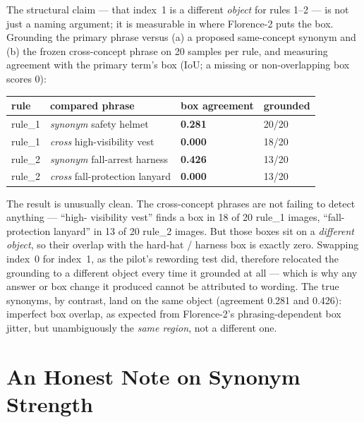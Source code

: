 The structural claim --- that index~1 is a different \emph{object} for rules 1--2 --- is not just a
naming argument; it is measurable in where Florence-2 puts the box. Grounding the primary phrase versus
(a) a proposed same-concept synonym and (b) the frozen cross-concept phrase on 20 samples per rule, and
measuring agreement with the primary term's box (IoU; a missing or non-overlapping box scores 0):

\begin{center}
\begin{tabular}{p{2.0cm}p{4.6cm}p{3.0cm}p{2.8cm}}
\toprule
\textbf{rule} & \textbf{compared phrase} & \textbf{box agreement} & \textbf{grounded} \\
\midrule
rule\_1 & \emph{synonym} safety helmet          & \textbf{0.281} & 20/20 \\
rule\_1 & \emph{cross} high-visibility vest      & \textbf{0.000} & 18/20 \\
\midrule
rule\_2 & \emph{synonym} fall-arrest harness     & \textbf{0.426} & 13/20 \\
rule\_2 & \emph{cross} fall-protection lanyard   & \textbf{0.000} & 13/20 \\
\bottomrule
\end{tabular}
\label{tab:p15-iou}
\end{center}

The result is unusually clean. The cross-concept phrases are not failing to detect anything --- ``high-
visibility vest'' finds a box in 18 of 20 rule\_1 images, ``fall-protection lanyard'' in 13 of 20
rule\_2 images. But those boxes sit on a \emph{different object}, so their overlap with the hard-hat /
harness box is exactly zero. Swapping index~0 for index~1, as the pilot's rewording test did, therefore
relocated the grounding to a different object every time it grounded at all --- which is why any
answer or box change it produced cannot be attributed to wording. The true synonyms, by contrast, land
on the same object (agreement 0.281 and 0.426): imperfect box overlap, as expected from Florence-2's
phrasing-dependent box jitter, but unambiguously the \emph{same region}, not a different one.

\section{An Honest Note on Synonym Strength}

